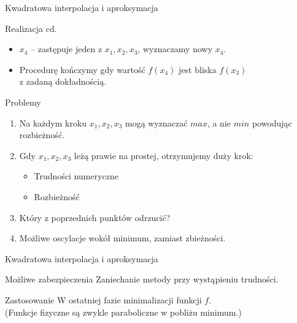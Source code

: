   \begin{frame}{Kwadratowa interpolacja i aproksymacja}
    \begin{block}{Realizacja cd.}
      \begin{itemize}
        \item $x_{4}$ -- zastępuje jeden z $x_{1}{,}x_{2}{,}x_{3}$,
        wyznaczamy nowy $ x_{4} $.
        \item Procedurę kończymy gdy wartość $f(x_{4})$ jest bliska $f(x_{3})$\\
        z zadaną dokładnością.
      \end{itemize}
    \end{block}
    \begin{block}{Problemy}
      \begin{enumerate}
        \item Na każdym kroku $x_{1}{,}x_{2}{,}x_{3}$ mogą
        wyznaczać $max$, a nie $min$ powodując rozbieżność.
        \item Gdy $x_{1}{,}x_{2}{,}x_{3}$ leżą prawie na prostej, otrzymujemy duży krok:
        \begin{itemize}
          \item Trudności numeryczne
          \item Rozbieżność
        \end{itemize}
        \item Który z poprzednich punktów odrzucić?
        \item Możliwe oscylacje wokół minimum, zamiast zbieżności.
      \end{enumerate}
    \end{block}
  \end{frame}

    \begin{frame}{Kwadratowa interpolacja i aproksymacja}
      \begin{block}{Możliwe zabezpieczenia}
        Zaniechanie metody przy wystąpieniu trudności.
      \end{block}
      \begin{block}{Zastosowanie}
        W ostatniej fazie minimalizacji funkcji $f$.\\
        (Funkcje fizyczne są zwykle paraboliczne w pobliżu minimum.)
      \end{block}
    \end{frame}

